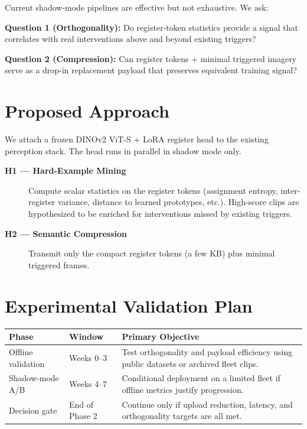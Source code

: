 \documentclass[11pt]{article}
\begin{document}
Current shadow-mode pipelines are effective but not exhaustive. We ask:

\textbf{Question 1 (Orthogonality):} Do register-token statistics provide a signal that correlates with real interventions above and beyond existing triggers?

\textbf{Question 2 (Compression):} Can register tokens + minimal triggered imagery serve as a drop-in replacement payload that preserves equivalent training signal?

\section{Proposed Approach}

We attach a frozen DINOv2 ViT-S + LoRA register head to the existing perception stack. The head runs in parallel in shadow mode only.

\begin{description}
  \item[\textbf{H1 --- Hard-Example Mining}] Compute scalar statistics on the register tokens (assignment entropy, inter-register variance, distance to learned prototypes, etc.). High-score clips are hypothesized to be enriched for interventions missed by existing triggers.
  \item[\textbf{H2 --- Semantic Compression}] Transmit only the compact register tokens (a few KB) plus minimal triggered frames.
\end{description}

\section{Experimental Validation Plan}

\begin{table}[htbp]
\centering
\small
\begin{tabular}{|p{}|p{}|p{}|}
\hline
\textbf{Phase} & \textbf{Window} & \textbf{Primary Objective} \\
\hline
Offline validation & Weeks 0--3 & Test orthogonality and payload efficiency using public datasets or archived fleet clips. \\
\hline
Shadow-mode A/B & Weeks 4--7 & Conditional deployment on a limited fleet if offline metrics justify progression. \\
\hline
Decision gate & End of Phase 2 & Continue only if upload reduction, latency, and orthogonality targets are all met. \\
\hline
\end{tabular}
\end{table}
\end{document}
